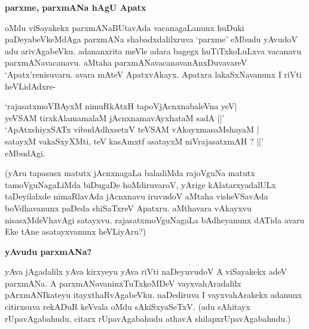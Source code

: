 \noindent
{\bf\large{parxme, parxmANa hAgU Apatx}}\label{page135}

oMdu viSayakekx parxmANaBUtavAda vacanagaLanunx huDuki paDeyabeVkeMdAga parxmANa shabadxdalilxruva `parxme' eMbudu yAvudoV adu arivAgabeVku. adananxrita meVle adara bagegx huTiTxkoLuLxva vacanavu parxmANavacanavu. aMtaha parxmANavacanavanAnxDuvavareV `Apatx'renisuvaru. avara mAteV ApatxvAkayx. Apatxra lakaSxNavanunx I riVti heVLidAdxre-

\begin{shloka}
`rajasatxmoVBAyxM nimuRkAtxH tapoVjAcnxnabaleVna yeV|\\\label{135}
yeVSAM tirxkAlamamalaM jAcnxnamavAyxhataM sadA ||'\\
`ApAtxshiyxSATx vibudAdhxsetxV teVSAM vAkayxmasaMshayaM |\\
satayxM vakaSxyXMti, teV kasAmxtf asatayxM niVrajasatxmAH ? ||' eMbudAgi.
\end{shloka}

(yAru tapasusx matutx jAcnxnagaLa baladiMda rajoVguNa matutx tamoVguNagaLiMda biDugaDe hoMdiruvaroV, yArige kAlatarxyadalULx taDeyilalxde nimaRlavAda jAcnxnavu iruvudoV aMtaha visheVSavAda boVdhavanunx paDeda shiSaTxreV Apatxru. aMthavara vAkayxvu nisasxMdeVhavAgi satayxvu. rajasatxmoVguNagaLa bAdheyanunx dATida avaru Eke tAne asatayxvanunx heVLiyAru?)

\noindent
{\bf\large{yAvudu parxmANa?}}\label{page134}

yAva jAgadalilx yAva kirxyeyu yAva riVti naDeyuvudoV A viSayakekx adeV parxmANa. A parxmANavaninxTuTxkoMDeV vayxvahAradalilx pArxmANIkateyu itayxthaRvAgabeVku. naDediruva I vayxvahArakekx adanunx citirxsuva rekADuR keVvala oMdu sAkiSxyaSeTxV. (adu sAhitayx rUpavAgabahudu, citarx rUpavAgabahudu athavA shilapxrUpavAgabahudu.)

